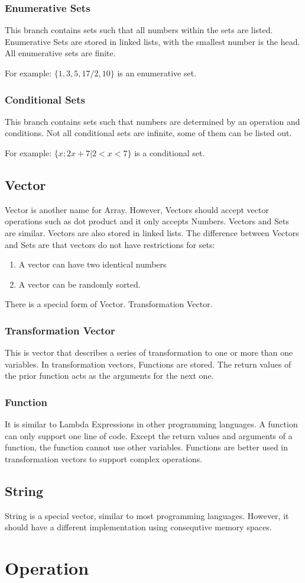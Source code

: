 \documentclass[12pt, a4paper]{IEEEtran}
\begin{document}
	\subsubsection{Enumerative Sets}
	This branch contains sets such that all numbers within the sets are listed. Enumerative Sets are stored in linked lists, with the smallest number is the head. All enumerative sets are finite.
		
	For example: $\{1, 3, 5, 17/2, 10\}$ is an enumerative set.
		
	\subsubsection{Conditional Sets}
	This branch contains sets such that numbers are determined by an operation and conditions. Not all conditional sets are infinite, some of them can be listed out. 
		
	For example: $\{x:2x+7|2<x<7\}$ is a conditional set.
		
\subsection{Vector}
	Vector is another name for Array. However, Vectors should accept vector operations such as dot product and it only accepts Numbers. Vectors and Sets are similar. Vectors are also stored in linked lists. The difference between Vectors and Sets are that vectors do not have restrictions for sets:
	\begin{enumerate}
	\item A vector can have two identical numbers
	\item A vector can be randomly sorted.
	\end{enumerate}
	There is a special form of Vector. Transformation Vector.
	
	\subsubsection{Transformation Vector}
	This is vector that describes a series of transformation to one or more than one variables. In transformation vectors, Functions are stored. The return values of the prior function acts as the arguments for the next one.
	
	\subsubsection{Function}
	It is similar to Lambda Expressions in other programming languages. A function can only support one line of code. Except the return values and arguments of a function, the function cannot use other variables. Functions are better used in transformation vectors to support complex operations.
	
\subsection{String}
	String is a special vector, similar to most programming languages. However, it should have a different implementation using consequtive memory spaces.
	
\section{Operation}
\end{document}

